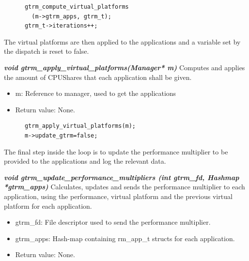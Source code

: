 \documentclass[nobiblatex]{LTHthesis}
\begin{document}
\begin{lstlisting}
	  gtrm_compute_virtual_platforms
		(m->gtrm_apps, gtrm_t);
	  gtrm_t->iterations++;
\end{lstlisting}

The virtual platforms are then applied to the applications and a variable set by the dispatch is reset to false.
\begin{framed}
	\begin{flushleft}
			\textbf{\emph{{void gtrm\_apply\_virtual\_platforms(Manager* m)}}}
	  \newline
			Computes and applies the amount of CPUShares that each application 
		shall be given.
			\begin{itemize}
			\item m: Reference to manager, used to get the applications
			\item Return value: None.
			\end{itemize}
	\end{flushleft}	
\end{framed}
\begin{lstlisting}
	  gtrm_apply_virtual_platforms(m); 
	  m->update_gtrm=false;																	
\end{lstlisting}

The final step inside the loop is to update the performance multiplier to be
provided to the applications and log the relevant data.
\begin{framed}
	\begin{flushleft}
			\textbf{\emph{{void gtrm\_update\_performance\_multipliers \newline
	  (int gtrm\_fd, Hashmap *gtrm\_apps)}}} \newline
			Calculates, updates and sends the performance multiplier to 
	  each application, using the performance, virtual platform and 
	  the previous virtual platform for each application.
			\begin{itemize} 
			\item gtrm\_fd: File descriptor used to send the performance 
		multiplier.
			\item gtrm\_apps: Hash-map containing rm\_app\_t structs for 
		each application.
			\item Return value: None.
			\end{itemize}
	\end{flushleft}	
\end{framed}
\end{document}
